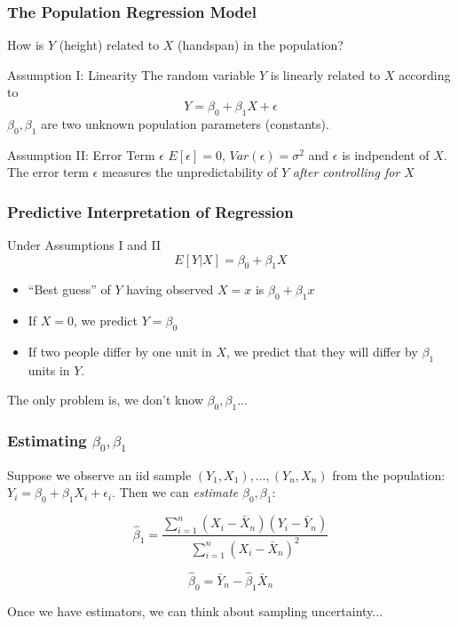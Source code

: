 \documentclass[handout]{beamer}
\begin{document}
\begin{frame}
	\frametitle{The Population Regression Model}
	How is $Y$ (height) related to $X$ (handspan) in the population?
	\begin{block}{Assumption I: Linearity}
		The random variable $Y$ is linearly related to $X$ according to 
			$$Y = \beta_0 + \beta_1 X + \epsilon$$
		$\beta_0,\beta_1$ are two unknown population parameters (constants).
	\end{block}

	\begin{block}
		{Assumption II: Error Term $\epsilon$}
		$E[\epsilon]=0$, $Var(\epsilon) = \sigma^2$ and $\epsilon$ is indpendent of $X$. The error term $\epsilon$ measures the unpredictability of $Y$ \emph{after controlling for $X$}
	\end{block}
\end{frame}
\begin{frame}
	\frametitle{Predictive Interpretation of Regression}
	\begin{block}
		{Under Assumptions I and II}
		$$E[Y|X] = \beta_0 + \beta_1 X$$ 
			\begin{itemize}
				\item ``Best guess'' of $Y$ having observed $X=x$ is $\beta_0 + \beta_1 x$
				\item If $X = 0$, we predict $Y = \beta_0$
				\item If two people differ by one unit in $X$, we predict that they will differ by $\beta_1$ units in $Y$.
			\end{itemize}
	\end{block}
	\alert{The only problem is, we don't know $\beta_0, \beta_1$...}
\end{frame}
\begin{frame}
	\frametitle{Estimating $\beta_0, \beta_1$}
Suppose we observe an iid sample $(Y_1, X_1), \hdots, (Y_n, X_n)$ from the population: $Y_i = \beta_0 + \beta_1 X_i + \epsilon_i$. Then we can \emph{estimate} $\beta_0, \beta_1$:

	$$\widehat{\beta}_1 = \frac{\sum_{i=1}^n (X_i - \bar{X}_n) (Y_i - \bar{Y}_n)}{\sum_{i=1}^n (X_i - \bar{X}_n)^2}$$

	
	$$\widehat{\beta}_0 = \bar{Y}_n - \widehat{\beta}_1 \bar{X}_n$$

\vspace{2em}
	\alert{Once we have estimators, we can think about sampling uncertainty...}
\end{frame}
\end{document}
